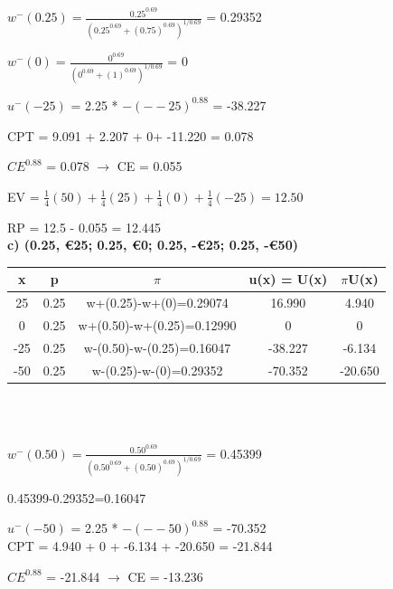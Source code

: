 \documentclass{article}
\begin{document}
\Large 

$w^-(0.25) = \frac{0.25^{0.69}}{(0.25^{0.69}+(0.75)^{0.69})^{1/0.69}}$ = 0.29352

$w^-(0) = \frac{0^{0.69}}{(0^{0.69}+(1)^{0.69})^{1/0.69}}$ = 0

$u^-(-25)$ = 2.25 * $-(--25)^{0.88}$ = -38.227 \\

\normalsize

CPT = 9.091 + 2.207 + 0+ -11.220 = 0.078

$CE^{0.88}$ = 0.078 $\rightarrow$ CE = 0.055

\vspace{1.5mm}

EV = $\frac{1}{4}(50)+\frac{1}{4}(25)+\frac{1}{4}(0)+\frac{1}{4}(-25)= 12.50 $

RP = 12.5 - 0.055 = 12.445 \\ 

\textbf{ c) (0.25, €25; 0.25, €0; 0.25, -€25; 0.25, -€50)}

\vspace{2mm}

   \begin{tabular}{|c|c|c|c|c|}
   	\hline
   	x  & p    & $\pi$                         & u(x) = U(x) & $\pi$U(x)  \\ \hline
   	25 & 0.25 & w+(0.25)-w+(0)=0.29074    & 16.990      & 4.940 \\ \hline
   	0 & 0.25 & w+(0.50)-w+(0.25)=0.12990 & 0     & 0  \\ \hline
   	-25 & 0.25 & w-(0.50)-w-(0.25)=0.16047 & -38.227      & -6.134  \\ \hline
   	-50  & 0.25 & w-(0.25)-w-(0)=0.29352    & -70.352           & -20.650      \\ \hline
   \end{tabular} \\ \\ 
 
 \Large
 
$w^-(0.50) = \frac{0.50^{0.69}}{(0.50^{0.69}+(0.50)^{0.69})^{1/0.69}}$ = 0.45399 \\

\normalsize

0.45399-0.29352=0.16047

$u^-(-50)$ = 2.25 * $-(--50)^{0.88}$ = -70.352 \\

CPT = 4.940 + 0 + -6.134 + -20.650 = -21.844

$CE^{0.88}$ = -21.844 $\rightarrow$ CE = -13.236
\end{document}
